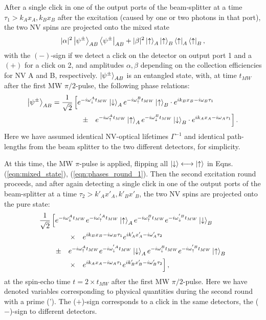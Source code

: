 After a single click in one of the output ports of the beam-splitter at a time $\tau_1 > k_A x_A, k_B x_B$ after the excitation (caused by one or two photons in that port), the two NV spins are projected onto the mixed state
\begin{equation}
\label{eqn:mixed_state}
|\alpha|^2 \left|\psi^{\pm}\right>_{AB} \left<\psi^{\pm}\right|_{AB} + |\beta|^2  \left|\uparrow\right>_A\left|\uparrow\right>_B\left<\uparrow\right|_A\left<\uparrow\right|_B,
\end{equation}
with the $(-)$-sign if we detect a click on the detector on output port 1 and a $(+)$ for a click on 2, and amplitudes $\alpha, \beta$ depending on the collection efficiencies for NV A and B, respectively. $\left|\psi^{\pm}\right>_{AB}$ is an entangled state, with, at time $t_{MW}$ after the first MW $\pi/2$-pulse, the following phase relations:
\begin{align}
\nonumber
\label{eqn:phases_round_1}
\left|\psi^{\pm}\right>_{AB}&=\frac{1}{\sqrt{2}}\left[ e^{-i\omega_\downarrow^A t_{MW}} \left|\downarrow\right>_A e^{-i\omega_\uparrow^B t_{MW}} \left|\uparrow\right>_B \cdot e^{i k_B x_B - i \omega_B \tau_1} \right. \\ 
& \qquad \qquad \left. 
\pm \quad e^{-i\omega_\uparrow^A t_{MW}} \left|\uparrow\right>_A e^{-i\omega_\downarrow^B t_{MW}} \left|\downarrow\right>_B \cdot e^{i k_A x_A - i\omega_A\tau_1} \right].
\end{align}
Here we have assumed identical NV-optical lifetimes $\Gamma^{-1}$ and identical path-lengths from the beam splitter to the two different detectors, for simplicity.

At this time, the MW $\pi$-pulse is applied, flipping all $\left|\downarrow\right> \longleftrightarrow \left|\uparrow\right>$ in Eqns.\,(\ref{eqn:mixed_state}), (\ref{eqn:phases_round_1}). Then the second excitation round proceeds, and after again detecting a single click in one of the output ports of the beam-splitter at a time $\tau_2 > k'_A x'_A, k'_B x'_B$, the two NV spins are projected onto the pure state:
\begin{align}
\label{eqn:total_phase}
\nonumber
&\frac{1}{\sqrt{2}}\left[ e^{-i\omega_\downarrow^A t_{MW}} e^{-i\omega_\uparrow^{' A} t_{MW}} \left|\uparrow\right>_A e^{-i\omega_\uparrow^B t_{MW}} e^{-i\omega_\downarrow^{' B} t_{MW}} \left|\downarrow\right>_B \right. \\ \nonumber
& \qquad \qquad \left. \times \quad e^{i k_B x_B -i \omega_B\tau_1} e^{i k'_A x'_A- i \omega'_A \tau_2}\right. \\ \nonumber
& \qquad  \left. 
\pm \quad e^{-i\omega_\uparrow^A t_{MW}}e^{-i\omega_\downarrow^{' A} t_{MW}} \left|\downarrow\right>_A e^{-i\omega_\downarrow^B t_{MW}}e^{-i\omega_\uparrow^{' B} t_{MW}} \left|\uparrow\right>_B \right. \\ 
& \qquad \qquad \left. \times \quad e^{i k_A x_A -i\omega_A \tau_1} e^{i k'_B x'_B - i \omega'_B \tau_2} \right],
\end{align}
at the spin-echo time $t=2 \times t_{MW}$ after the first MW $\pi/2$-pulse. Here we have denoted variables corresponding to physical quantities during the second round with a prime ('). The ($+$)-sign corresponds to a click in the same detectors, the ($-$)-sign to different detectors.

